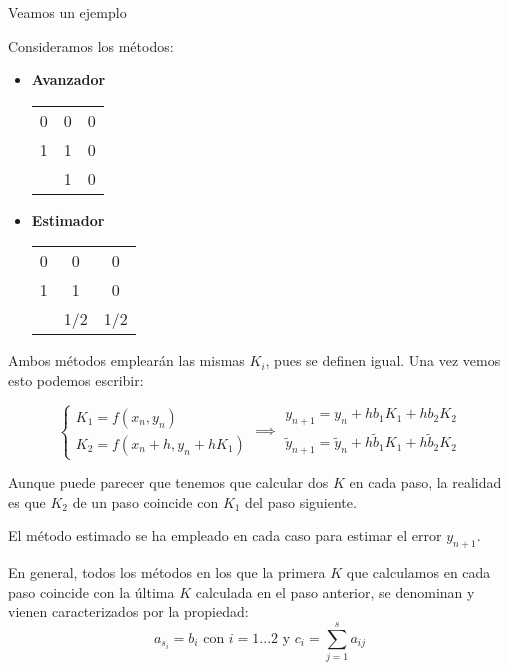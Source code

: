 Veamos un ejemplo
\begin{example}
Consideramos los métodos:
\begin{itemize}
\item \textbf{Avanzador}
\begin{center}
\begin{tabular}{c|cc}
0 & 0 & 0 \\
1 & 1 & 0\\
\hline
 & 1 & 0\\
\end{tabular}
\end{center}

\item \textbf{Estimador}

\begin{center}
\begin{tabular}{c|cc}
0 & 0 & 0 \\
1 & 1 & 0 \\
\hline
 & 1/2 & 1/2\\
\end{tabular}
\end{center}
\end{itemize}

Ambos métodos emplearán las mismas $K_i$, pues se definen igual. Una vez vemos esto podemos escribir:

\[\left\{ \begin{array}{l}
K_1=f(x_n,y_n)\\
K_2=f(x_n+h,y_n+hK_1)

\end{array} \implies  \begin{array}{l}
y_{n+1} = y_n+hb_1K_1+hb_2K_2\\
\tilde{y}_{n+1} = \tilde{y}_n + h\tilde{b}_1K_1 + h\tilde{b}_2K_2
\end{array}\right.\]

Aunque puede parecer que tenemos que calcular dos $K$ en cada paso, la realidad es que $K_2$ de un paso coincide con $K_1$ del paso siguiente.

El método estimado se ha empleado en cada caso para estimar el error $y_{n+1}$.
\end{example}

En general, todos los métodos en los que la primera $K$ que calculamos en cada paso coincide con la última $K$ calculada en el paso anterior, se denominan  y vienen caracterizados por la propiedad:
\[a_{s_i}=b_i \text{ con } i=1...2 \text{ y } c_i = \sum_{j=1}^sa_{ij}\]